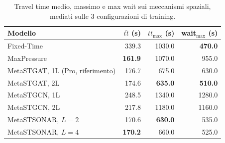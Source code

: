 \begin{table}[htbp]
  \centering
  \begin{tabular}{@{}lrrr@{}}
    \toprule
    Modello                          & $\overline{tt}$ (s) & $tt_{\max}$ (s) & wait$_{\max}$ (s) \\
    \midrule
    Fixed-Time                       & 339.3               & 1030.0          & \textbf{470.0}    \\
    MaxPressure                      & \textbf{161.9}      & 1070.0          & 955.0             \\
    MetaSTGAT, 1L (Pro, riferimento) & 176.7               & 675.0           & 630.0             \\
    MetaSTGAT, 2L                    & 174.6               & \textbf{635.0}  & \textbf{510.0}    \\
    MetaSTGCN, 1L                    & 248.5               & 1340.0          & 1280.0            \\
    MetaSTGCN, 2L                    & 217.8               & 1180.0          & 1160.0            \\
    MetaSTSONAR, $L{=}2$             & 170.6               & \textbf{630.0}  & 535.0             \\
    MetaSTSONAR, $L{=}4$             & \textbf{170.2}      & 660.0           & 525.0             \\
    \bottomrule
  \end{tabular}
  \caption{Travel time medio, massimo e max wait sui
    meccanismi spaziali, mediati sulle 3 configurazioni di training.}
  \label{tab:architetture-train}
\end{table}


